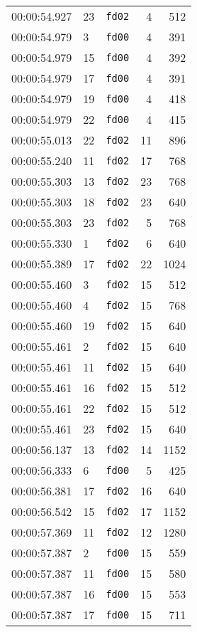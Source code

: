 \documentclass{article}
\begin{document}
\begin{longtable}{lllrr}
00:00:54.927 & 23 & \texttt{fd02} & 4 & 512 \\
00:00:54.979 & 3 & \texttt{fd00} & 4 & 391 \\
00:00:54.979 & 15 & \texttt{fd00} & 4 & 392 \\
00:00:54.979 & 17 & \texttt{fd00} & 4 & 391 \\
00:00:54.979 & 19 & \texttt{fd00} & 4 & 418 \\
00:00:54.979 & 22 & \texttt{fd00} & 4 & 415 \\
00:00:55.013 & 22 & \texttt{fd02} & 11 & 896 \\
00:00:55.240 & 11 & \texttt{fd02} & 17 & 768 \\
00:00:55.303 & 13 & \texttt{fd02} & 23 & 768 \\
00:00:55.303 & 18 & \texttt{fd02} & 23 & 640 \\
00:00:55.303 & 23 & \texttt{fd02} & 5 & 768 \\
00:00:55.330 & 1 & \texttt{fd02} & 6 & 640 \\
00:00:55.389 & 17 & \texttt{fd02} & 22 & 1024 \\
00:00:55.460 & 3 & \texttt{fd02} & 15 & 512 \\
00:00:55.460 & 4 & \texttt{fd02} & 15 & 768 \\
00:00:55.460 & 19 & \texttt{fd02} & 15 & 640 \\
00:00:55.461 & 2 & \texttt{fd02} & 15 & 640 \\
00:00:55.461 & 11 & \texttt{fd02} & 15 & 640 \\
00:00:55.461 & 16 & \texttt{fd02} & 15 & 512 \\
00:00:55.461 & 22 & \texttt{fd02} & 15 & 512 \\
00:00:55.461 & 23 & \texttt{fd02} & 15 & 640 \\
00:00:56.137 & 13 & \texttt{fd02} & 14 & 1152 \\
00:00:56.333 & 6 & \texttt{fd00} & 5 & 425 \\
00:00:56.381 & 17 & \texttt{fd02} & 16 & 640 \\
00:00:56.542 & 15 & \texttt{fd02} & 17 & 1152 \\
00:00:57.369 & 11 & \texttt{fd02} & 12 & 1280 \\
00:00:57.387 & 2 & \texttt{fd00} & 15 & 559 \\
00:00:57.387 & 11 & \texttt{fd00} & 15 & 580 \\
00:00:57.387 & 16 & \texttt{fd00} & 15 & 553 \\
00:00:57.387 & 17 & \texttt{fd00} & 15 & 711 \\

\end{longtable}
\end{document}
